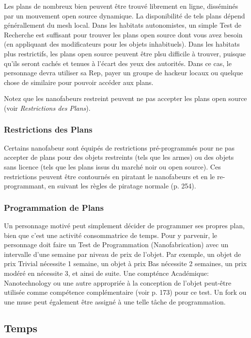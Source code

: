 Les plans de nombreux bien peuvent être trouvé librement en ligne, disséminés par un mouvement open source dynamique. La disponibilité de tels plans dépend générallement du mesh local. Dans les habitats autonomistes, un simple Test de Recherche est suffisant pour trouver les plans open source dont vous avez besoin (en appliquant des modificateurs pour les objets inhabituels). Dans les habitats plus restrictifs, les plans open source peuvent être plsu difficile à trouver, puisque qu'ils seront cachés et tenues à l'écart des yeux des autorités. Dans ce cas, le personnage devra utiliser sa Rep, payer un groupe de hackeur locaux ou quelque chose de similaire pour pouvoir accéder aux plans. 

Notez que les nanofabeurs restreint peuvent ne pas accepter les plans open source (voir \textit{Restrictions des Plans}). 

\subsubsection{Restrictions des Plans} 

Certains nanofabeur sont équipés de restrictions pré-programmés pour ne pas accepter de plans pour des objets restreints (tels que les armes) ou des objets sans licence (tels que les plans issus du marché noir ou open source). Ces restrictions peuvent être contournés en piratant le nanofabeurs et en le re-programmant, en suivant les règles de piratage normale (p. 254). 

\subsubsection{Programmation de Plans} 

Un personnage motivé peut simplement décider de programmer ses propres plan, bien que c'est une activité consommatrice de temps. Pour y parvenir, le personnage doit faire un Test de Programmation (Nanofabrication) avec un intervalle d'une semaine par niveau de prix de l'objet. Par exemple, un objet de prix Trivial nécessite 1 semaine, un objet à prix Bas nécessite 2 semaines, un prix modéré en nécessite 3, et ainsi de suite. Une compténce Académique: Nanotechnology ou une autre appropriée à la conception de l'objet peut-être utilisée comme compétence complémentaire (voir p. 173) pour ce test. Un fork ou une muse peut également être assigné à une telle tâche de programmation. 

\subsection{Temps} 


